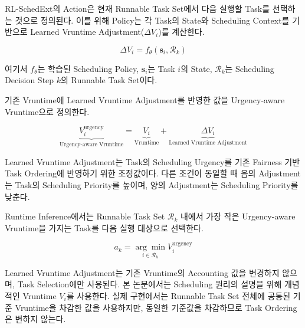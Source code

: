 RL-SchedExt의 Action은 현재 Runnable Task Set에서
다음 실행할 Task를 선택하는 것으로 정의된다.
이를 위해 Policy는 각 Task의 State와 Scheduling Context를
기반으로 Learned Vruntime Adjustment($\Delta V_i$)를 계산한다.

\begin{equation}
    \Delta V_i = f_{\theta}(\mathbf{s}_i,\mathcal{R}_k)
    \label{eq:learned_adjustment}
\end{equation}

여기서 $f_{\theta}$는 학습된 Scheduling Policy, $\mathbf{s}_i$는 Task $i$의 State,
$\mathcal{R}_k$는 Scheduling Decision Step $k$의 Runnable Task Set이다.

기존 Vruntime에 Learned Vruntime Adjustment를
반영한 값을 Urgency-aware Vruntime으로 정의한다.

\begin{equation}
    \underbrace{V_i^{\mathrm{urgency}}}
        _{\text{Urgency-aware Vruntime}}
    =
    \underbrace{V_i}
        _{\text{Vruntime}}
    +
    \underbrace{\Delta V_i}
        _{\text{Learned Vruntime Adjustment}}
    \label{eq:urgency_aware_vruntime}
\end{equation}

Learned Vruntime Adjustment는 Task의 Scheduling Urgency를
기존 Fairness 기반 Task Ordering에 반영하기 위한 조정값이다.
다른 조건이 동일할 때 음의 Adjustment는 Task의 Scheduling Priority를
높이며, 양의 Adjustment는 Scheduling Priority를 낮춘다.

Runtime Inference에서는 Runnable Task Set $\mathcal{R}_k$ 내에서
가장 작은 Urgency-aware Vruntime을 가지는 Task를
다음 실행 대상으로 선택한다.

\begin{equation}
    a_k =
    \underset{i\in\mathcal{R}_k}{\arg\min}
    V_i^{\mathrm{urgency}}
    \label{eq:task_selection}
\end{equation}

Learned Vruntime Adjustment는 기존 Vruntime의
Accounting 값을 변경하지 않으며,
Task Selection에만 사용된다.
본 논문에서는 Scheduling 원리의 설명을 위해 개념적인 Vruntime $V_i$를
사용한다. 실제 구현에서는 Runnable Task Set 전체에 공통된 기준 Vruntime을
차감한 값을 사용하지만, 동일한 기준값을 차감하므로 Task Ordering은
변하지 않는다.


